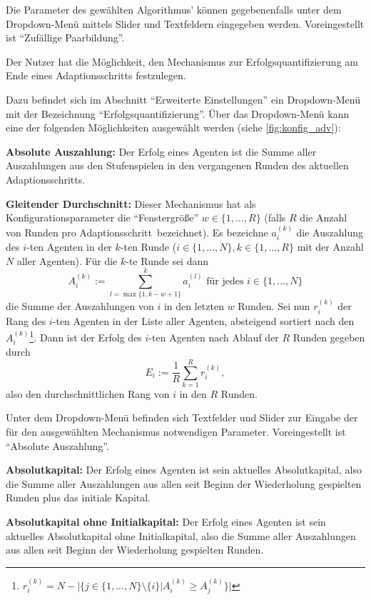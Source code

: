 \documentclass[parskip=full,11pt]{scrartcl}
\def\adapt{Adaptionsschritt}
\begin{document}
Die Parameter des gewählten Algorithmus' können gegebenenfalls unter dem Dropdown-Menü mittels Slider und Textfeldern eingegeben werden. Voreingestellt ist \enquote{Zufällige Paarbildung}.

Der \Gls{Nutzer} hat die Möglichkeit, den Mechanismus zur Erfolgsquantifizierung am Ende eines \adapt s festzulegen.

Dazu befindet sich im Abschnitt \enquote{Erweiterte Einstellungen} ein Dropdown-Menü mit der Bezeichnung \enquote{Erfolgsquantifizierung}. Über das Dropdown-Menü kann eine der folgenden Möglichkeiten ausgewählt werden (siehe \cref{fig:konfig_adv}):

\textbf{Absolute Auszahlung:}
Der Erfolg eines Agenten ist die Summe aller Auszahlungen aus den Stufenspielen in den vergangenen Runden des aktuellen \adapt s.

\textbf{Gleitender Durchschnitt:}
Dieser Mechanismus hat als Konfigurationsparameter die \enquote{Fenstergröße} \(w \in \{1,...,R\}\) (falls \(R\) die Anzahl von Runden pro \adapt\ bezeichnet). Es bezeichne \(a_i^{(k)}\) die Auszahlung des \(i\)-ten Agenten in der \(k\)-ten Runde (\(i \in \{1,...,N\}, k \in \{1,...,R\}\) mit der Anzahl \(N\) aller Agenten). Für die \(k\)-te Runde sei dann
\[
A_i^{(k)} := \sum_{l = \max\{1,k-w+1\}}^k a_i^{(l)} \text{  für jedes  } i \in \{1,...,N\}
\]
die Summe der Auszahlungen von \(i\) in den letzten \(w\) Runden. Sei nun \(r_i^{(k)}\) der Rang des \(i\)-ten Agenten in der Liste aller Agenten, absteigend sortiert nach den \(A_i^{(k)}\)\footnote{\(r_i^{(k)} = N - |\{j \in \{1,...,N\} \setminus \{i\} | A_i^{(k)} \geq A_j^{(k)}\}|\)}. Dann ist der Erfolg des \(i\)-ten Agenten nach Ablauf der \(R\) Runden gegeben durch
\[
E_i := \frac 1R \sum_{k=1}^R r_i^{(k)},
\]
also den durchschnittlichen Rang von \(i\) in den \(R\) Runden.

Unter dem Dropdown-Menü befinden sich Textfelder und Slider zur Eingabe der für den ausgewählten Mechanismus notwendigen Parameter. Voreingestellt ist \enquote{Absolute Auszahlung}.

\textbf{Absolutkapital:}
Der Erfolg eines Agenten ist sein aktuelles Absolutkapital, also die Summe aller Auszahlungen aus allen seit Beginn der Wiederholung gespielten Runden plus das initiale Kapital.

\textbf{Absolutkapital ohne Initialkapital:}
Der Erfolg eines Agenten ist sein aktuelles Absolutkapital ohne Initialkapital, also die Summe aller Auszahlungen aus allen seit Beginn der Wiederholung gespielten Runden.
\end{document}
